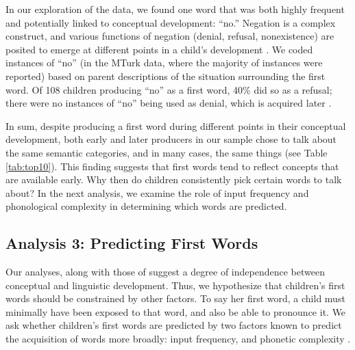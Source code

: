 \documentclass[10pt,letterpaper]{article}
\begin{document}
In our exploration of the data, we found one word that was both highly frequent and potentially linked to conceptual development: ``no.'' Negation is a complex construct, and various functions of negation (denial, refusal, nonexistence) are posited to emerge at different points in a child's development \cite{pea1982}. We coded instances of ``no'' (in the MTurk data, where the majority of instances were reported) based on parent descriptions of the situation surrounding the first word. Of 108 children producing ``no'' as a first word, 40\% did so as a refusal; there were no instances of ``no'' being used as denial, which is acquired later \cite{pea1982}. 

In sum, despite producing a first word during different points in their conceptual development, both early and later producers in our sample chose to talk about the same semantic categories, and in many cases, the same things (see Table \ref{tab:top10}). This finding suggests that first words tend to reflect concepts that are available early. Why then do children consistently pick certain words to talk about? In the next analysis, we examine the role of input frequency and phonological complexity in determining which words are predicted. 

\subsection{Analysis 3: Predicting First Words}

Our analyses, along with those of  suggest a degree of independence between conceptual and linguistic development. Thus, we hypothesize that children's first words should be constrained by other factors. To say her first word, a child must minimally have been exposed to that word, and also be able to pronounce it. We ask whether children's first words are predicted by two factors known to predict the acquisition of words more broadly: input frequency, and phonetic complexity \cite{morgan1996,goodman2008}.

\end{document}
